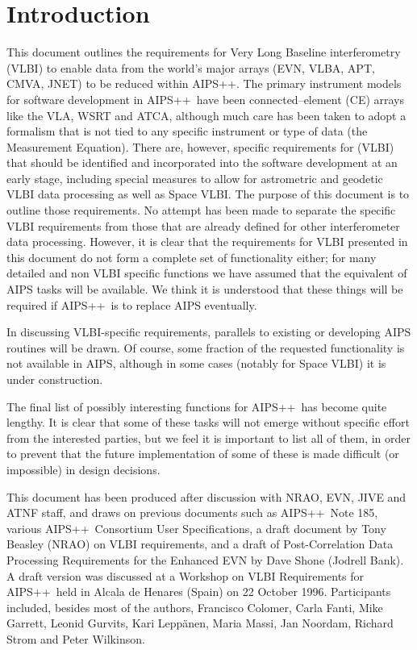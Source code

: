 \newcommand{\aipspp}{{AIPS++}}

\section{Introduction} 

\noindent
This document outlines the requirements for Very Long Baseline
interferometry (VLBI) to enable data from the world's major arrays
(EVN, VLBA, APT, CMVA, JNET) to be reduced within \aipspp. The primary
instrument models for software development in \aipspp\ have been
connected--element (CE) arrays like the VLA, WSRT and ATCA, although
much care has been taken to adopt a formalism that is not tied to any
specific instrument or type of data (the Measurement Equation). There
are, however, specific requirements for (VLBI) that should be
identified and incorporated into the software development at an early
stage, including special measures to allow for astrometric and
geodetic VLBI data processing as well as Space VLBI. The purpose of
this document is to outline those requirements. No attempt has been
made to separate the specific VLBI requirements from those that are
already defined for other interferometer data processing. However, it
is clear that the requirements for VLBI presented in this document
do not form a complete set of functionality either; for many
detailed and non VLBI specific functions we have assumed that the
equivalent of AIPS tasks will be available. We think it is understood
that these things will be required if \aipspp\ is to replace AIPS
eventually.

In discussing VLBI-specific requirements, parallels to existing or
developing AIPS routines will be drawn. Of course, some fraction of the
requested functionality is not available in AIPS, although in some
cases (notably for Space VLBI) it is under construction. 

The final list of possibly interesting functions for \aipspp\ has
become quite lengthy. It is clear that some of these tasks will not
emerge without specific effort from the interested parties, but we
feel it is important to list all of them, in order to prevent that the
future implementation of some of these is made difficult (or
impossible) in design decisions.

This document has been produced after discussion with NRAO, EVN, JIVE
and ATNF staff, and draws on previous documents such as \aipspp\ Note
185, various \aipspp\ Consortium User Specifications, a draft document
by Tony Beasley (NRAO) on VLBI requirements, and a draft of
Post-Correlation Data Processing Requirements for the Enhanced EVN by
Dave Shone (Jodrell Bank). A draft version was discussed at a Workshop
on VLBI Requirements for \aipspp\ held in Alcala de Henares (Spain) on
22 October 1996. Participants included, besides most of the authors,
Francisco Colomer, Carla Fanti, Mike Garrett, Leonid Gurvits, Kari
Lepp\"anen, Maria Massi, Jan Noordam, Richard Strom and Peter
Wilkinson.

